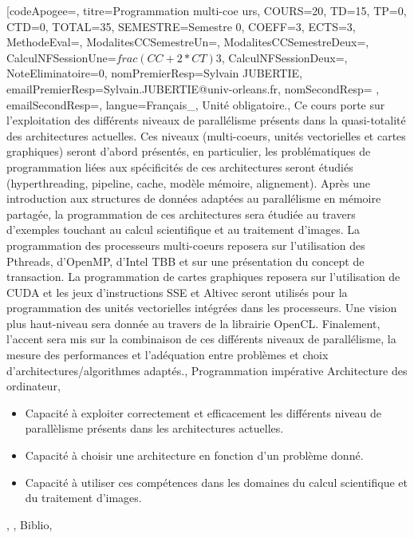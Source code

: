 \module[codeApogee={},
titre={Programmation multi-coe urs},
COURS={20},
TD={15},
TP={0},
CTD={0},
TOTAL={35},
SEMESTRE={Semestre 0},
COEFF={3},
ECTS={3},
MethodeEval={},
ModalitesCCSemestreUn={},
ModalitesCCSemestreDeux={},
CalculNFSessionUne={$frac{(CC+2*CT)}{3}$},
CalculNFSessionDeux={},
NoteEliminatoire={0},
nomPremierResp={Sylvain JUBERTIE},
emailPremierResp={Sylvain.JUBERTIE@univ-orleans.fr},
nomSecondResp={ },
emailSecondResp={},
langue={Français_},
{Unité obligatoire.},
{Ce cours porte sur l'exploitation des différents niveaux de parallélisme présents dans la quasi-totalité des architectures actuelles. Ces niveaux (multi-coeurs, unités vectorielles et cartes graphiques) seront d'abord présentés, en particulier, les problématiques de programmation liées aux spécificités de ces architectures seront étudiés (hyperthreading, pipeline, cache, modèle mémoire, alignement).
Après une introduction aux structures de données adaptées au parallélisme en mémoire partagée, la programmation de ces architectures sera étudiée au travers d'exemples touchant au calcul scientifique et au traitement d'images. La programmation des processeurs multi-coeurs reposera sur l'utilisation des Pthreads, d'OpenMP, d'Intel TBB et sur une présentation du concept de transaction. La programmation de cartes graphiques reposera sur l'utilisation de CUDA et les jeux d'instructions SSE et Altivec seront utilisés pour la programmation des unités vectorielles intégrées dans les processeurs. Une vision plus
haut-niveau sera donnée au travers de la librairie OpenCL. Finalement, l'accent sera mis sur la combinaison de ces différents niveaux de parallélisme, la mesure des performances et l'adéquation
entre problèmes et choix d'architectures/algorithmes adaptés.},
{Programmation impérative
Architecture des ordinateur},
{\begin{itemize}
\item Capacité à exploiter correctement et efficacement les différents niveau de parallèlisme présents dans les architectures actuelles.
\item Capacité à choisir une architecture en fonction d'un problème donné.
\item Capacité à utiliser ces compétences dans les domaines du calcul scientifique et du traitement d'images.
\end{itemize}},
{},
{Biblio},

\vfill


